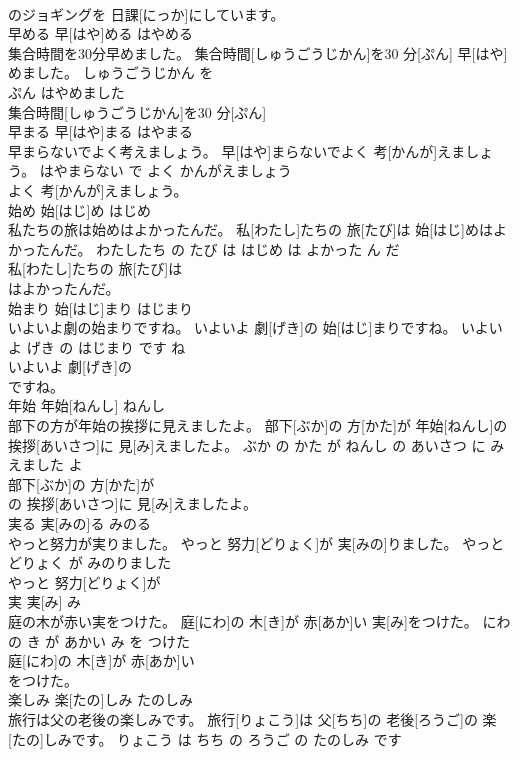 \documentclass[8pt]{extreport}
\begin{document}
\begin{CJK}{UTF8}{min}
\\	のジョギングを 日課[にっか]にしています。			
\\	早める	早[はや]める	はやめる	
\\	集合時間を30分早めました。	集合時間[しゅうごうじかん]を30 分[ぷん] 早[はや]めました。	しゅうごうじかん を 
\\	ぷん はやめました	
\\	集合時間[しゅうごうじかん]を30 分[ぷん]
\\	早まる	早[はや]まる	はやまる	
\\	早まらないでよく考えましょう。	早[はや]まらないでよく 考[かんが]えましょう。	はやまらない で よく かんがえましょう	
\\	よく 考[かんが]えましょう。			
\\	始め	始[はじ]め	はじめ	
\\	私たちの旅は始めはよかったんだ。	私[わたし]たちの 旅[たび]は 始[はじ]めはよかったんだ。	わたしたち の たび は はじめ は よかった ん だ	
\\	私[わたし]たちの 旅[たび]は
\\	はよかったんだ。			
\\	始まり	始[はじ]まり	はじまり	
\\	いよいよ劇の始まりですね。	いよいよ 劇[げき]の 始[はじ]まりですね。	いよいよ げき の はじまり です ね	
\\	いよいよ 劇[げき]の
\\	ですね。			
\\	年始	年始[ねんし]	ねんし	
\\	部下の方が年始の挨拶に見えましたよ。	部下[ぶか]の 方[かた]が 年始[ねんし]の 挨拶[あいさつ]に 見[み]えましたよ。	ぶか の かた が ねんし の あいさつ に みえました よ	
\\	部下[ぶか]の 方[かた]が
\\	の 挨拶[あいさつ]に 見[み]えましたよ。			
\\	実る	実[みの]る	みのる	
\\	やっと努力が実りました。	やっと 努力[どりょく]が 実[みの]りました。	やっと どりょく が みのりました	
\\	やっと 努力[どりょく]が
\\	実	実[み]	み	
\\	庭の木が赤い実をつけた。	庭[にわ]の 木[き]が 赤[あか]い 実[み]をつけた。	にわ の き が あかい み を つけた	
\\	庭[にわ]の 木[き]が 赤[あか]い
\\	をつけた。			
\\	楽しみ	楽[たの]しみ	たのしみ	
\\	旅行は父の老後の楽しみです。	旅行[りょこう]は 父[ちち]の 老後[ろうご]の 楽[たの]しみです。	りょこう は ちち の ろうご の たのしみ です	

\end{CJK}
\end{document}
